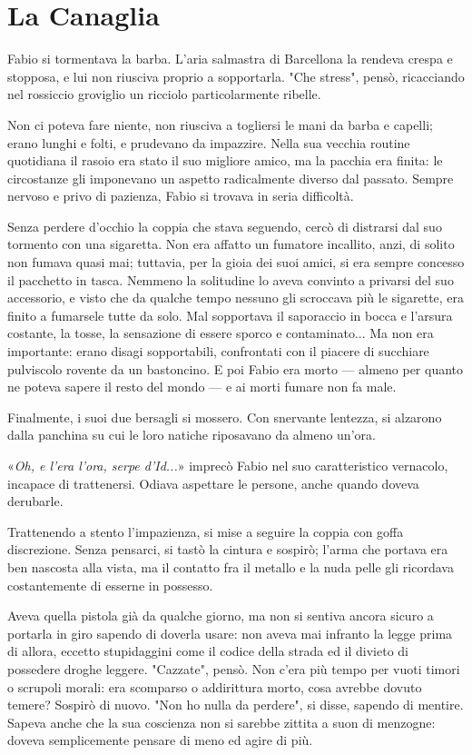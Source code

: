 \chapter{La Canaglia}

Fabio si tormentava la barba. L'aria salmastra di Barcellona la rendeva crespa e stopposa, e lui non riusciva proprio a sopportarla. "Che stress", pensò, ricacciando nel rossiccio groviglio un ricciolo particolarmente ribelle.

Non ci poteva fare niente, non riusciva a togliersi le mani da barba e capelli; erano lunghi e folti, e prudevano da impazzire. Nella sua vecchia routine quotidiana il rasoio era stato il suo migliore amico, ma la pacchia era finita: le circostanze gli imponevano un aspetto radicalmente diverso dal passato. Sempre {nervoso} e privo di pazienza, Fabio si trovava in seria difficoltà.

Senza perdere d'occhio la coppia che stava seguendo, cercò di distrarsi dal suo tormento con una sigaretta. Non era affatto un fumatore incallito, anzi, di solito non fumava quasi mai; tuttavia, per la gioia dei suoi amici, si era sempre concesso il pacchetto in tasca. Nemmeno la solitudine lo aveva convinto a privarsi del suo accessorio, e visto che da qualche tempo nessuno gli scroccava più le sigarette, era finito a fumarsele tutte da solo. Mal sopportava il saporaccio in bocca e l'arsura costante, la tosse, la sensazione di essere sporco e contaminato... Ma non era importante: erano disagi sopportabili, confrontati con il piacere di succhiare pulviscolo rovente da un bastoncino. E poi Fabio era morto --- almeno per quanto ne poteva sapere il resto del mondo --- e ai morti fumare non fa male.

Finalmente, i suoi due bersagli si mossero. Con snervante lentezza, si alzarono dalla panchina su cui le loro natiche riposavano da almeno un'ora.

«\emph{Oh, e l'era l'ora, serpe d'Id...}» imprecò Fabio nel suo caratteristico vernacolo, incapace di trattenersi. Odiava aspettare le persone, anche quando doveva derubarle.

Trattenendo a stento l'impazienza, si mise a seguire la coppia con goffa discrezione. Senza pensarci, si tastò la cintura e sospirò; l'arma che portava era ben nascosta alla vista, ma il contatto fra il metallo e la nuda pelle gli ricordava costantemente di esserne in possesso.

Aveva quella pistola già da qualche giorno, ma non si sentiva ancora sicuro a portarla in giro sapendo di doverla usare: non aveva mai infranto la legge prima di allora, eccetto stupidaggini come il codice della strada ed il divieto di possedere droghe leggere. "Cazzate", pensò. Non c'era più tempo per vuoti timori o scrupoli morali: era scomparso o addirittura morto, cosa avrebbe dovuto temere? Sospirò di nuovo. "Non ho nulla da perdere", si disse, sapendo di mentire. Sapeva anche che la sua coscienza non si sarebbe zittita a suon di menzogne: doveva semplicemente pensare di meno ed agire di più.

